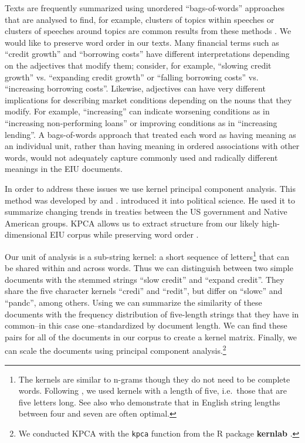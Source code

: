 \documentclass[]{article}
\begin{document}
Texts are frequently summarized using unordered ``bags-of-words''
approaches that are analysed to find, for example, clusters of topics within speeches or clusters of speeches around topics are common results from these methods \citep[for a review see][]{Grimmer2013}. We would like to preserve word order in our texts. Many financial terms such as ``credit growth'' and ``borrowing costs'' have different interpretations depending on the adjectives that modify them; consider, for example, ``slowing credit growth'' vs. ``expanding credit growth'' or ``falling borrowing costs'' vs. ``increasing borrowing costs''. Likewise, adjectives can have very different implications for describing market conditions depending on the nouns that they modify. For example, ``increasing'' can indicate worsening conditions as in ``increasing non-performing loans'' or improving conditions as in ``increasing lending''.  A bags-of-words approach that treated each word as having meaning as an individual unit, rather than having meaning in ordered associations with other words, would not adequately capture commonly used and radically different meanings in the EIU documents.

In order to address these issues we use kernel principal component analysis. This method was developed by \cite{Scholkopf1998} and \cite{lodhi2002}. \cite{Spirling2012} introduced it into political science. He used it to summarize changing trends in treaties between the US government and Native American groups. KPCA allows us to extract structure from our likely high-dimensional EIU corpus while preserving word order \cite[6531--6537]{Zhang2010}.

Our unit of analysis is a sub-string kernel: a short sequence of letters\footnote{The kernels are similar to n-grams though they do not need to be complete words. Following \cite{Spirling2012}, we used kernels with a length of five, i.e.~those that are five letters long. See also \cite{lodhi2002} who demonstrate that in English string lengths between four and seven are often optimal.} that can be shared within and across words. Thus we can distinguish between two simple documents with the stemmed strings ``slow credit'' and ``expand credit''. They share the five character kernels ``credi'' and ``redit'', but differ on ``slowc'' and ``pandc'', among others. Using \cite{lodhi2002} we can summarize the similarity of these documents with the frequency distribution of five-length strings that they have in common--in this case one--standardized by document length. We can find these pairs for all of the documents in our corpus to create a kernel matrix. Finally, we can scale the documents using principal component analysis.\footnote{We conducted KPCA with the \texttt{kpca} function from the R package \textbf{kernlab} \citep{kerblabCite}.}
\end{document}
